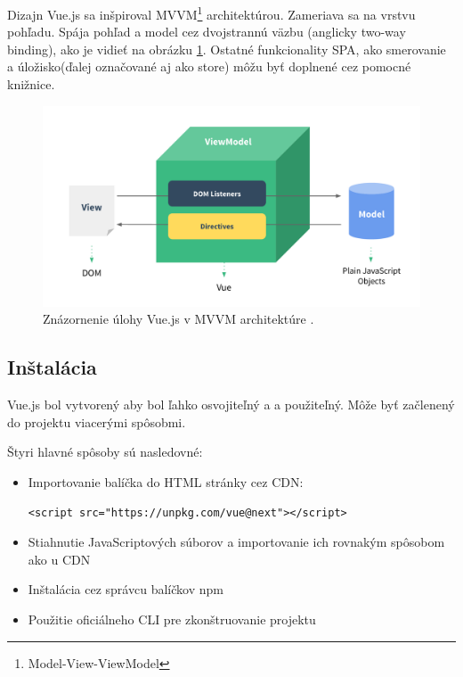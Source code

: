 Dizajn Vue.js sa inšpiroval MVVM\footnote{Model-View-ViewModel} architektúrou. Zameriava sa na vrstvu pohľadu. Spája pohľad a model cez dvojstrannú väzbu (anglicky two-way binding), ako je vidieť na obrázku \ref{pic:mvvm}. Ostatné funkcionality SPA, ako smerovanie a úložisko(ďalej označované aj ako store) môžu byť doplnené cez pomocné knižnice.
    \begin{figure}[!hbt]
        \centering
        \includegraphics[scale=0.2]{obrazky/mvvm.png}
        \caption{Znázornenie úlohy Vue.js v MVVM architektúre \cite{vue-guide}.}
        \label{pic:mvvm}
    \end{figure}

\subsection*{Inštalácia}
Vue.js bol vytvorený aby bol ľahko osvojiteľný a a použiteľný. Môže byť začlenený do projektu viacerými spôsobmi. 

Štyri hlavné spôsoby sú nasledovné:
    \begin{itemize}
        \item Importovanie balíčka do HTML stránky cez CDN:
        \begin{verbatim}<script src="https://unpkg.com/vue@next"></script>\end{verbatim}
        \item Stiahnutie JavaScriptových súborov a importovanie ich rovnakým spôsobom ako u CDN
        \item Inštalácia cez správcu balíčkov npm
        \item Použitie oficiálneho CLI pre zkonštruovanie projektu
    \end{itemize}
    
